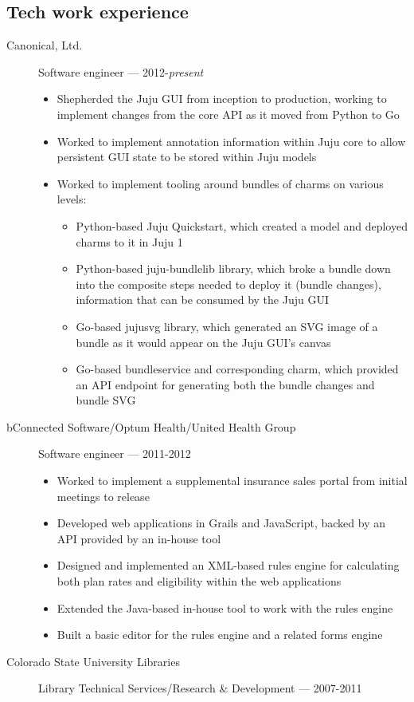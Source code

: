 \documentclass[letterpaper]{memoir}
\begin{document}
\newpage

\subsection{Tech work experience}

\begin{description}
\item[Canonical, Ltd.]
Software engineer --- 2012-\emph{present}

\begin{itemize}
\tightlist
\item
  Shepherded the Juju GUI from inception to production, working to implement changes from the core API as it moved from Python to Go
\item
  Worked to implement annotation information within Juju core to allow persistent GUI state to be stored within Juju models
\item
  Worked to implement tooling around bundles of charms on various levels:

  \begin{itemize}
  \tightlist
  \item
    Python-based Juju Quickstart, which created a model and deployed charms to it in Juju 1
  \item
    Python-based juju-bundlelib library, which broke a bundle down into the composite steps needed to deploy it (bundle changes), information that can be consumed by the Juju GUI
  \item
    Go-based jujusvg library, which generated an SVG image of a bundle as it would appear on the Juju GUI's canvas
  \item
    Go-based bundleservice and corresponding charm, which provided an API endpoint for generating both the bundle changes and bundle SVG
  \end{itemize}
\end{itemize}
\item[bConnected Software/Optum Health/United Health Group]
Software engineer --- 2011-2012

\begin{itemize}
\tightlist
\item
  Worked to implement a supplemental insurance sales portal from initial meetings to release
\item
  Developed web applications in Grails and JavaScript, backed by an API provided by an in-house tool
\item
  Designed and implemented an XML-based rules engine for calculating both plan rates and eligibility within the web applications
\item
  Extended the Java-based in-house tool to work with the rules engine
\item
  Built a basic editor for the rules engine and a related forms engine
\end{itemize}
\item[Colorado State University Libraries]
Library Technical Services/Research \& Development --- 2007-2011


\end{description}
\end{document}
